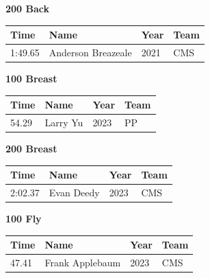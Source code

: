 \vspace{1.2em}
\noindent\begin{minipage}[t]{0.98\textwidth}
\centering
\textbf{\textcolor{teamprimary}{200 Back}}\par
\vspace{0.5em}
\centering
\small
\renewcommand{\arraystretch}{1.0}
\setlength{\tabcolsep}{4pt}
\begin{tabular}{@{}p{2.5cm}p{4.5cm}p{1.5cm}p{2.5cm}@{}}
\toprule
\textbf{Time} & \textbf{Name} & \textbf{Year} & \textbf{Team} \\
\midrule
1:49.65 & Anderson Breazeale & 2021 & CMS \\
\bottomrule
\end{tabular}
\end{minipage}
\vspace{1.2em}
\noindent\begin{minipage}[t]{0.98\textwidth}
\centering
\textbf{\textcolor{teamprimary}{100 Breast}}\par
\vspace{0.5em}
\centering
\small
\renewcommand{\arraystretch}{1.0}
\setlength{\tabcolsep}{4pt}
\begin{tabular}{@{}p{2.5cm}p{4.5cm}p{1.5cm}p{2.5cm}@{}}
\toprule
\textbf{Time} & \textbf{Name} & \textbf{Year} & \textbf{Team} \\
\midrule
54.29 & Larry Yu & 2023 & PP \\
\bottomrule
\end{tabular}
\end{minipage}
\vspace{1.2em}
\noindent\begin{minipage}[t]{0.98\textwidth}
\centering
\textbf{\textcolor{teamprimary}{200 Breast}}\par
\vspace{0.5em}
\centering
\small
\renewcommand{\arraystretch}{1.0}
\setlength{\tabcolsep}{4pt}
\begin{tabular}{@{}p{2.5cm}p{4.5cm}p{1.5cm}p{2.5cm}@{}}
\toprule
\textbf{Time} & \textbf{Name} & \textbf{Year} & \textbf{Team} \\
\midrule
2:02.37 & Evan Deedy & 2023 & CMS \\
\bottomrule
\end{tabular}
\end{minipage}
\vspace{1.2em}
\noindent\begin{minipage}[t]{0.98\textwidth}
\centering
\textbf{\textcolor{teamprimary}{100 Fly}}\par
\vspace{0.5em}
\centering
\small
\renewcommand{\arraystretch}{1.0}
\setlength{\tabcolsep}{4pt}
\begin{tabular}{@{}p{2.5cm}p{4.5cm}p{1.5cm}p{2.5cm}@{}}
\toprule
\textbf{Time} & \textbf{Name} & \textbf{Year} & \textbf{Team} \\
\midrule
47.41 & Frank Applebaum & 2023 & CMS \\
\bottomrule
\end{tabular}
\end{minipage}
